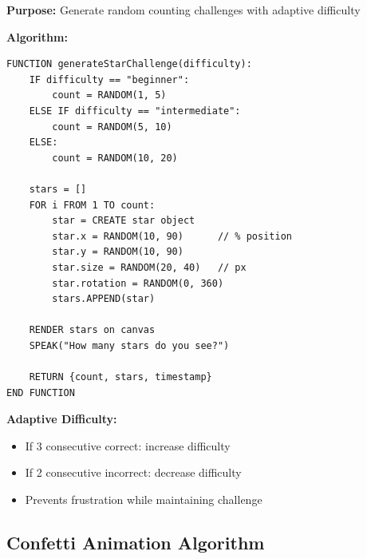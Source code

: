\documentclass[12pt, a4paper]{article}
\begin{document}
\begin{tcolorbox}[colback=nebulapink!5, colframe=nebulapink, title=\textbf{Count the Stars - Quantity Generation}]

\textbf{Purpose:} Generate random counting challenges with adaptive difficulty

\textbf{Algorithm:}
\begin{verbatim}
FUNCTION generateStarChallenge(difficulty):
    IF difficulty == "beginner":
        count = RANDOM(1, 5)
    ELSE IF difficulty == "intermediate":
        count = RANDOM(5, 10)
    ELSE:
        count = RANDOM(10, 20)
    
    stars = []
    FOR i FROM 1 TO count:
        star = CREATE star object
        star.x = RANDOM(10, 90)      // % position
        star.y = RANDOM(10, 90)
        star.size = RANDOM(20, 40)   // px
        star.rotation = RANDOM(0, 360)
        stars.APPEND(star)
    
    RENDER stars on canvas
    SPEAK("How many stars do you see?")
    
    RETURN {count, stars, timestamp}
END FUNCTION
\end{verbatim}

\textbf{Adaptive Difficulty:}
\begin{itemize}
    \item If 3 consecutive correct: increase difficulty
    \item If 2 consecutive incorrect: decrease difficulty
    \item Prevents frustration while maintaining challenge
\end{itemize}

\end{tcolorbox}

\subsection{Confetti Animation Algorithm}
\end{document}
